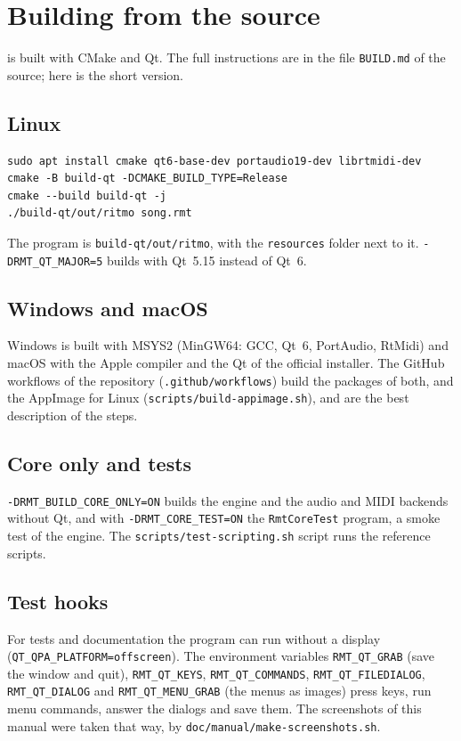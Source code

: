 \chapter{Building from the source}\label{app:building}

\RITMO{} is built with CMake and Qt. The full instructions are in the file \texttt{BUILD.md} of the source; here is the short version.

\section{Linux}

\begin{lstlisting}
sudo apt install cmake qt6-base-dev portaudio19-dev librtmidi-dev
cmake -B build-qt -DCMAKE_BUILD_TYPE=Release
cmake --build build-qt -j
./build-qt/out/ritmo song.rmt
\end{lstlisting}

The program is \texttt{build-qt/out/ritmo}, with the \texttt{resources} folder next to it. \texttt{-DRMT\_QT\_MAJOR=5} builds with
Qt~5.15 instead of Qt~6.

\section{Windows and macOS}

Windows is built with MSYS2 (MinGW64: GCC, Qt~6, PortAudio, RtMidi) and macOS with the Apple compiler and the Qt of the official installer. The
GitHub workflows of the repository (\texttt{.github/workflows}) build the packages of both, and the AppImage for Linux
(\texttt{scripts/build-appimage.sh}), and are the best description of the steps.

\section{Core only and tests}

\texttt{-DRMT\_BUILD\_CORE\_ONLY=ON} builds the engine and the audio and MIDI backends without Qt, and with \texttt{-DRMT\_CORE\_TEST=ON}
the \texttt{RmtCoreTest} program, a smoke test of the engine. The \texttt{scripts/test-scripting.sh} script runs the reference scripts.

\section{Test hooks}

For tests and documentation the program can run without a display (\texttt{QT\_QPA\_PLATFORM=offscreen}). The environment variables
\texttt{RMT\_QT\_GRAB} (save the window and quit), \texttt{RMT\_QT\_KEYS}, \texttt{RMT\_QT\_COMMANDS}, \texttt{RMT\_QT\_FILEDIALOG},
\texttt{RMT\_QT\_DIALOG} and \texttt{RMT\_QT\_MENU\_GRAB} (the menus as images) press keys, run menu commands, answer the dialogs and save them. The
screenshots of this manual were taken that way, by \texttt{doc/manual/make-screenshots.sh}.
